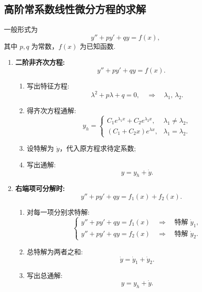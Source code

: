 \subsection{高阶常系数线性微分方程的求解}
\DTwoThree

一般形式为
\[
    y'' + p y' + q y = f(x),
\]
其中 $p,q$ 为常数，$f(x)$ 为已知函数.

\begin{enumerate}
    \item \textbf{二阶非齐次方程:}
          \[
              y'' + p y' + q y = f(x).
          \]
          \begin{enumerate}[label=(\roman*)]
              \item 写出特征方程:
                    \[
                        \lambda^2 + p\lambda + q = 0,
                        \quad \Rightarrow \quad
                        \lambda_1,\,\lambda_2.
                    \]
              \item 得齐次方程通解:
                    \[
                        y_h =
                        \begin{cases}
                            C_1 e^{\lambda_1 x} + C_2 e^{\lambda_2 x}, & \lambda_1 \neq \lambda_2, \\[0.5em]
                            (C_1 + C_2 x)e^{\lambda x},                & \lambda_1 = \lambda_2.
                        \end{cases}
                    \]
              \item 设特解为 $\dot{y}$，代入原方程求待定系数;
              \item 写出通解:
                    \[
                        \boxed{y = y_h + \dot{y}.}
                    \]
          \end{enumerate}

    \item \textbf{右端项可分解时:}
          \[
              y'' + p y' + q y = f_1(x) + f_2(x).
          \]
          \begin{enumerate}[label=(\roman*)]
              \item 对每一项分别求特解:
                    \[
                        \begin{cases}
                            y'' + p y' + q y = f_1(x) \quad \Rightarrow \quad \text{特解 } \dot{y}_1, \\[0.3em]
                            y'' + p y' + q y = f_2(x) \quad \Rightarrow \quad \text{特解 } \dot{y}_2.
                        \end{cases}
                    \]
              \item 总特解为两者之和:
                    \[
                        \boxed{\dot{y} = \dot{y}_1 + \dot{y}_2.}
                    \]
              \item 写出总通解:
                    \[
                        y = y_h + \dot{y}.
                    \]
          \end{enumerate}


\end{enumerate}
